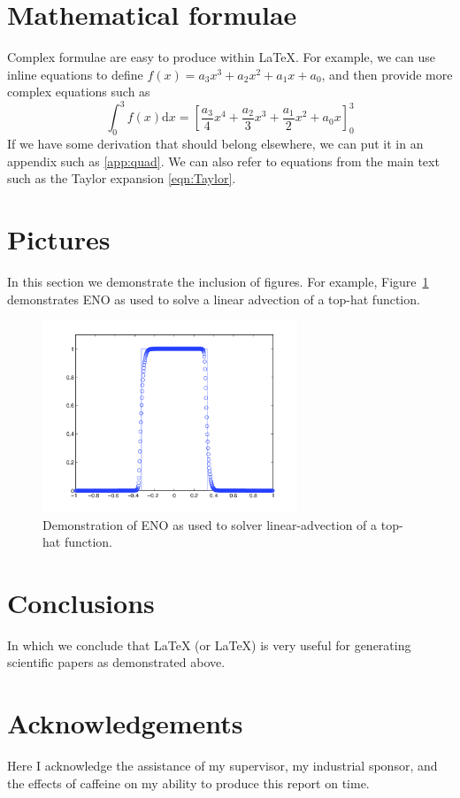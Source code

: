 \documentclass[final,3p,times,twocolumn]{elsarticle}
\begin{document}
\section{Mathematical formulae}
\label{sect:Formulae}
Complex formulae are easy to produce within \LaTeX{}. For example, we
can use inline equations to define $f(x) = a_3x^3 + a_2x^2 + a_1x +
a_0$, and then provide more complex equations such as
\begin{equation}
\int_0^3 f(x) \mathrm{d}x = \left[\frac{a_3}{4}x^4 + \frac{a_2}{3}x^3
  + \frac{a_1}{2}x^2 + a_0x\right]_0^3
\label{eqn:Taylor}
\end{equation}
If we have some derivation that should belong elsewhere, we can put it
in an appendix such as \ref{app:quad}. We can also refer to equations
from the main text such as the Taylor expansion \ref{eqn:Taylor}.
\section{Pictures}
\label{sect:Pictures}
In this section we demonstrate the inclusion of figures. For example,
Figure~\ref{fig:ENO1} demonstrates ENO as used to solve a linear advection
of a top-hat function.
\begin{figure}
\centering
\includegraphics[width=3in]{ENOTest3b.png}
\caption{Demonstration of ENO as used to solver linear-advection of a
  top-hat function.}
\label{fig:ENO1}
\end{figure}
\section{Conclusions}
\label{sect:Concl}
In which we conclude that LaTeX (or \LaTeX) is very useful for
generating scientific papers as demonstrated above.

\section*{Acknowledgements}
Here I acknowledge the assistance of my supervisor, my industrial sponsor,
and the effects of caffeine on my ability to produce this report on time.
\end{document}
